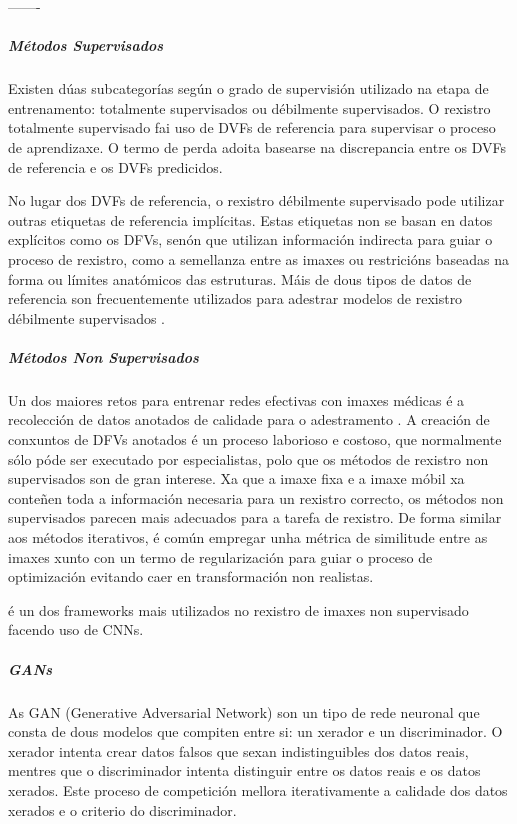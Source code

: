 -------

\subparagraph{Métodos Supervisados}
\label{subparagraph:Métodos Supervisados}

Existen dúas subcategorías según o grado de supervisión utilizado na etapa de entrenamento: totalmente supervisados ou débilmente supervisados.
O rexistro totalmente supervisado fai uso de DVFs de referencia para supervisar o proceso de aprendizaxe.
O termo de perda adoita basearse na discrepancia entre os DVFs de referencia e os DVFs predicidos.

No lugar dos DVFs de referencia, o rexistro débilmente supervisado pode utilizar outras etiquetas de referencia implícitas.
Estas etiquetas non se basan en datos explícitos como os DFVs, senón que utilizan información indirecta para guiar o proceso de rexistro, como a semellanza entre as imaxes ou restricións baseadas na forma ou límites anatómicos das estruturas.
Máis de dous tipos de datos de referencia son frecuentemente utilizados para adestrar modelos de rexistro débilmente supervisados \cite{bharati2022deeplearningmedicalimage}.

\subparagraph{Métodos Non Supervisados}
\label{subparagraph:Métodos Non Supervisados}

Un dos maiores retos para entrenar redes efectivas con imaxes médicas é a recolección de datos anotados de calidade para o adestramento \cite{medicalimageanalysis}.
A creación de conxuntos de DFVs anotados é un proceso laborioso e costoso, que normalmente sólo póde ser executado por especialistas, polo que os métodos de rexistro non supervisados son de gran interese.
Xa que a imaxe fixa e a imaxe móbil xa conteñen toda a información necesaria para un rexistro correcto, os métodos non supervisados parecen mais adecuados para a tarefa de rexistro.
De forma similar aos métodos iterativos, é común empregar unha métrica de similitude entre as imaxes xunto con un termo de regularización para guiar o proceso de optimización evitando caer en transformación non realistas.

\cite{Balakrishnan_2019voxelmorph} é un dos frameworks mais utilizados no rexistro de imaxes non supervisado facendo uso de CNNs.

\subparagraph{GANs}
\label{subparagraph:GANs}

As \gls{GAN} (Generative Adversarial Network) son un tipo de rede neuronal que consta de dous modelos que compiten entre si: un xerador e un discriminador. O xerador intenta crear datos falsos que sexan indistinguibles dos datos reais, mentres que o discriminador intenta distinguir entre os datos reais e os datos xerados. Este proceso de competición mellora iterativamente a calidade dos datos xerados e o criterio do discriminador.

